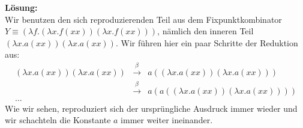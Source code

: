\documentclass[11pt,a4paper,ngerman]{article}
\begin{document}
\textbf{Lösung:}\\
   Wir benutzen den sich reproduzierenden Teil aus dem Fixpunktkombinator
   $Y \equiv (\lambda f. (\lambda x.f(xx)) (\lambda x.f(xx)))$, nämlich den inneren
   Teil $(\lambda x.a(xx)) (\lambda x.a(xx))$.
   Wir führen hier ein paar Schritte der Reduktion aus:
   $$\begin{array}{rcl}
      (\lambda x.a(xx)) (\lambda x.a(xx)) &\overset{\beta}{\longrightarrow}&
         a ((\lambda x.a(xx)) (\lambda x.a(xx)))\\
         &\overset{\beta}{\longrightarrow}& a(a((\lambda x.a(xx)) (\lambda x.a(xx))))\\
         ...
   \end{array}$$
   Wie wir sehen, reproduziert sich der ursprüngliche Ausdruck immer wieder und wir schachteln
   die Konstante $a$ immer weiter ineinander.
\end{document}
